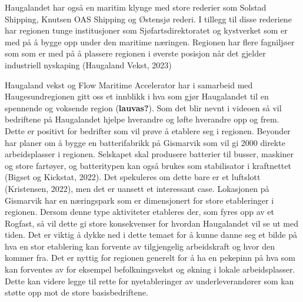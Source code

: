 \documentclass[
]{article}
\begin{document}
Haugalandet har også en maritim klynge med store rederier som Solstad
Shipping, Knutsen OAS Shipping og Østensjø rederi. I tillegg til disse
rederiene har regionen tunge institusjoner som Sjøfartsdirektoratet og
kystverket som er med på å bygge opp under den maritime næringen.
Regionen har flere fagniljøer som som er med på å plassere regionen i
øverste posisjon når det gjelder industriell nyskaping (Haugaland Vekst,
2023)

Haugaland vekst og Flow Maritime Accelerator har i samarbeid med
Haugesundregionen gitt oss et innblikk i hva som gjør Haugalandet til en
spennende og voksende region (\textbf{lauvas?}). Som det blir nevnt i
videoen så vil bedriftene på Haugalandet hjelpe hverandre og løfte
hverandre opp og frem. Dette er positivt for bedrifter som vil prøve å
etablere seg i regionen. Beyonder har planer om å bygge en
batterifabrikk på Gismarvik som vil gi 2000 direkte arbeidsplasser i
regionen. Selskapet skal produsere batterier til busser, maskiner og
store fartøyer, og batteritypen kan også brukes som stabilisator i
kraftnettet (Bigset og Kickstat, 2022). Det spekuleres om dette bare er
et luftslott (Kristensen, 2022), men det er uansett et interessant case.
Lokasjonen på Gismarvik har en næringspark som er dimensjonert for store
etableringer i regionen. Dersom denne type aktiviteter etableres der,
som fyres opp av et Rogfast, så vil dette gi store konsekvenser for
hvordan Haugalandet vil se ut med tiden. Det er viktig å dykke ned i
dette temaet for å kunne danne seg et bilde på hva en stor etablering
kan forvente av tilgjengelig arbeidskraft og hvor den kommer fra. Det er
nyttig for regionen generelt for å ha en pekepinn på hva som kan
forventes av for eksempel befolkningsvekst og økning i lokale
arbeidsplasser. Dette kan videre legge til rette for nyetableringer av
underleverandører som kan støtte opp mot de store basisbedriftene.
\end{document}
